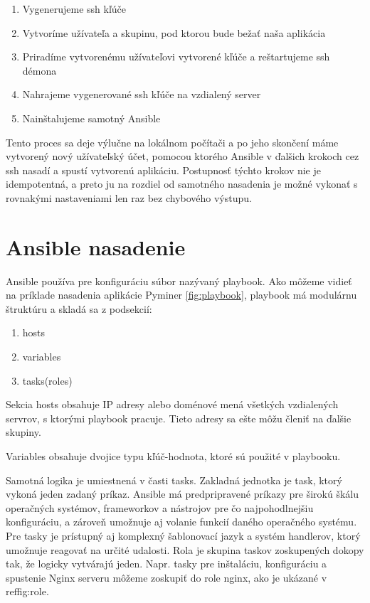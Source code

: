 \begin{enumerate}
  \item Vygenerujeme ssh kľúče
  \item Vytvoríme užívateľa a skupinu, pod ktorou bude bežať naša aplikácia
  \item Priradíme vytvorenému užívateľovi vytvorené kľúče a reštartujeme ssh démona
  \item Nahrajeme vygenerované ssh kľúče na vzdialený server
  \item Nainštalujeme samotný Ansible
\end{enumerate}

Tento proces sa deje výlučne na lokálnom počítači a po jeho skončení máme vytvorený nový užívateľský účet, pomocou ktorého Ansible v ďalšich krokoch cez ssh nasadí a spustí vytvorenú aplikáciu. Postupnosť týchto krokov nie je idempotentná, a preto ju na rozdiel od samotného nasadenia je možné vykonať s rovnakými nastaveniami len raz bez chybového výstupu.

\section{Ansible nasadenie}
Ansible používa pre konfiguráciu súbor nazývaný playbook.  Ako môžeme vidieť na príklade nasadenia aplikácie Pyminer \ref{fig:playbook},  playbook má modulárnu štruktúru a skladá sa z podsekcií:

\begin{enumerate}
  \item hosts
  \item variables
  \item tasks(roles)
\end{enumerate}

\par Sekcia hosts obsahuje IP adresy alebo doménové mená všetkých vzdialených servrov, s ktorými playbook pracuje. Tieto adresy sa ešte môžu členiť na ďalšie skupiny.
\par Variables obsahuje dvojice typu kľúč-hodnota, ktoré sú použité v playbooku.
\par Samotná logika je umiestnená v časti tasks. Zakladná jednotka je task, ktorý vykoná jeden zadaný príkaz. Ansible má predpripravené príkazy pre širokú škálu operačných systémov, frameworkov a nástrojov pre čo najpohodlnejšiu konfiguráciu, a zároveň umožnuje aj volanie funkcií daného operačného systému. Pre tasky je prístupný aj komplexný šablonovací jazyk a systém handlerov, ktorý umožnuje reagovať na určité udalosti.  Rola je skupina taskov zoskupených dokopy tak, že logicky vytvárajú jeden. Napr. tasky pre inštaláciu, konfiguráciu a spustenie Nginx serveru môžeme zoskupiť do role nginx, ako je ukázané v ref{fig:role}. 

